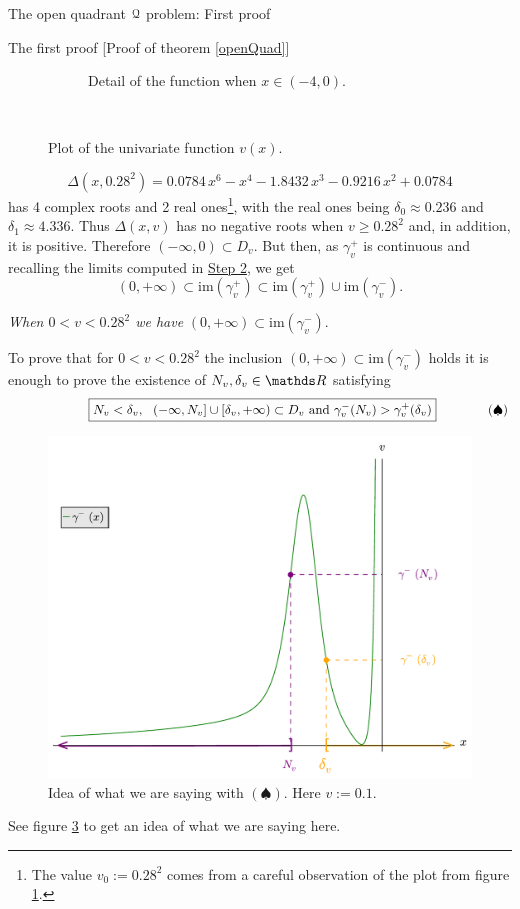 \documentclass[11pt, a4paper, english, twoside, notitlepage, openright]{report}
\begin{document}
\begin{chapter}{The open quadrant $\mathcal{Q}$ problem: First proof}
\begin{section}{The first proof} [Proof of theorem \ref{openQuad}]
\begin{figure}[h]
\begin{subfigure}{.5\linewidth}
\caption{Detail of the function when $x\in(-4,0)$.\label{fig:uveDetail}}
\end{subfigure}\\[1ex]
\caption{Plot of the univariate function $v(x)$.\label{fig:v(x)}}
\end{figure}
$$
\Delta(x,0.28^2)=0.0784\,x^{6}-x^{4}-1.8432\,x^{3}-0.9216\,x^{2}+0.0784
$$ 
has 4 complex roots and 2 real ones\footnote{The value $v_0:=0.28^2$ comes from a careful observation of the plot from figure \ref{fig:uveDetail}.}, with the real ones being $\delta_0\approx 0.236$ and $\delta_1\approx 4.336$. Thus $\Delta(x,v)$ has no negative roots when $v\ge 0.28^2$ and, in addition, it is positive. Therefore $(-\infty,0)\subset D_v$. But then, as $\gamma_v^+$ is continuous and recalling the limits computed in \hyperref[step2]{Step 2}, we get  
$$
(0,+\infty)\subset\text{im}(\gamma_v^+)\subset\text{im}(\gamma_v^+)\cup\text{im}(\gamma_v^-).
$$
\begin{center}
 \emph{When $0<v<0.28^2$ we have} $(0,+\infty)\subset\text{im}(\gamma_v^-)$.
\end{center}
\label{step4}
To prove that for $0<v<0.28^2$ the inclusion $(0,+\infty)\subset\text{im}(\gamma_v^-)$ holds it is enough to prove the existence of $N_v,\delta_v\in\R$ satisfying			
\begin{equation*}\qquad \quad
\qquad\quad\boxed{N_v<\delta_v,\ \ (-\infty,N_v]\cup[\delta_v,+\infty)\subset D_v\text{ and } \gamma_v^-(N_v)>\gamma_v^+(\delta_v)\\
}\qquad \qquad (\spadesuit)
\end{equation*}
\begin{figure}[h]
\centering
\includegraphics[width=1\textwidth]{plots/ch1_12_idea.pdf}
\caption{Idea of what we are saying with $(\spadesuit)$. Here $v:=0.1$.\label{fig:idea}}
\end{figure}
See figure \ref{fig:idea} to get an idea of what we are saying here. 


\end{section}
\end{chapter}
\end{document}
